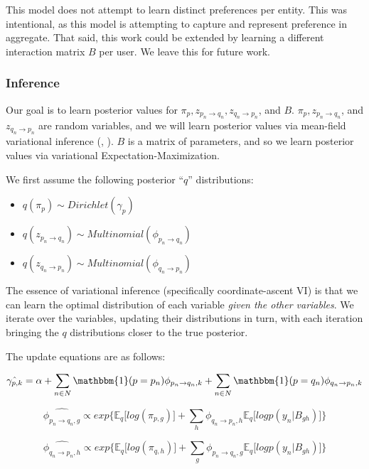 This model does not attempt to learn distinct preferences per entity.
This was intentional, as this model is attempting to capture and represent preference in aggregate.
That said, this work could be extended by learning a different interaction matrix $B$
per user.
We leave this for future work.

\subsubsection{Inference}

Our goal is to learn posterior values for $\pi_p, z_{p_n \rightarrow q_n}, z_{q_n \rightarrow p_n}$, and $B$.
$\pi_p, z_{p_n \rightarrow q_n}$, and $z_{q_n \rightarrow p_n}$ are random variables, and we will learn posterior values via mean-field variational inference (\cite{wainwright}, \cite{blei:2016}).
$B$ is a matrix of parameters, and so we learn posterior values via variational Expectation-Maximization.

\bigskip

We first assume the following posterior ``$q$'' distributions:

\begin{itemize}
	\item $q(\pi_p) \sim Dirichlet(\gamma_p)$
	\item $q(z_{p_n \rightarrow q_n}) \sim Multinomial(\phi_{p_n \rightarrow q_n})$
	\item $q(z_{q_n \rightarrow p_n}) \sim Multinomial(\phi_{q_n \rightarrow p_n})$
\end{itemize}

The essence of variational inference (specifically coordinate-ascent VI) is that we can learn the optimal distribution of each variable \textit{given the other variables}.
We iterate over the variables, updating their distributions in turn, with each iteration bringing the $q$ distributions closer to the true posterior.

The update equations are as follows:

\[
\hat{\gamma_{p,k}} = \alpha + \sum_{n \in N} \mathbbm{1}(p = p_n)\phi_{p_n \rightarrow q_n,k} + \sum_{n \in N} \mathbbm{1}(p = q_n)\phi_{q_n \rightarrow p_n,k}
\]

\[
\hat{\phi_{p_n \rightarrow q_n,g}} \propto exp\bigg\{\mathbb{E}_q\big[log(\pi_{p,g})\big] + \sum_{h}\phi_{q_n \rightarrow p_n,h}\mathbb{E}_q\big[logp(y_n|B_{gh})\big]\bigg\}
\]

\[
\hat{\phi_{q_n \rightarrow p_n,h}} \propto exp\bigg\{\mathbb{E}_q\big[log(\pi_{q,h})\big] + \sum_{g}\phi_{p_n \rightarrow q_n,g}\mathbb{E}_q\big[logp(y_n|B_{gh})\big]\bigg\}
\]

